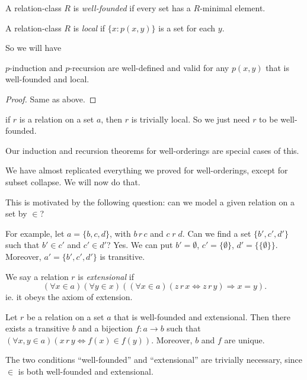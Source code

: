 \documentclass[a4paper]{article}
\begin{document}
\begin{defi}
  A relation-class $R$ is \emph{well-founded} if every set has a $R$-minimal element.
\end{defi}

\begin{defi}
  A relation-class $R$ is \emph{local} if $\{x: p(x, y)\}$ is a set for each $y$.
\end{defi}

So we will have
\begin{prop}
  $p$-induction and $p$-recursion are well-defined and valid for any $p(x, y)$ that is well-founded and local.
\end{prop}

\begin{proof}
  Same as above.
\end{proof}
\note if $r$ is a relation on a set $a$, then $r$ is trivially local. So we just need $r$ to be well-founded.

\note Our induction and recursion theorems for well-orderings are special cases of this.

We have almost replicated everything we proved for well-orderings, except for subset collapse. We will now do that.

This is motivated by the following question: can we model a given relation on a set by $\in$?

For example, let $a = \{b, c, d\}$, with $b\,r\,c$ and $c\;r\;d$. Can we find a set $\{b', c', d'\}$ such that $b'\in c'$ and $c'\in d'$? Yes. We can put $b' = \emptyset$, $c' = \{\emptyset\}$, $d' = \{\{\emptyset\}\}$. Moreover, $a' = \{b', c', d'\}$ is transitive.

\begin{defi}
  We say a relation $r$ is \emph{extensional} if 
  \[
    (\forall x\in a)(\forall y\in x)((\forall x\in a)(z\,r\,x \Leftrightarrow z\,r\,y)\Rightarrow  x = y).
  \]
  ie. it obeys the axiom of extension.
\end{defi}

\begin{thm}
  Let $r$ be a relation on a set $a$ that is well-founded and extensional. Then there exists a transitive $b$ and a bijection $f: a \to b$ such that $(\forall x, y\in a)(x\, r\, y\Leftrightarrow f(x) \in f(y))$. Moreover, $b$ and $f$ are unique.
\end{thm}
\note The two conditions ``well-founded'' and ``extensional'' are trivially necessary, since $\in$ is both well-founded and extensional.
\end{document}
